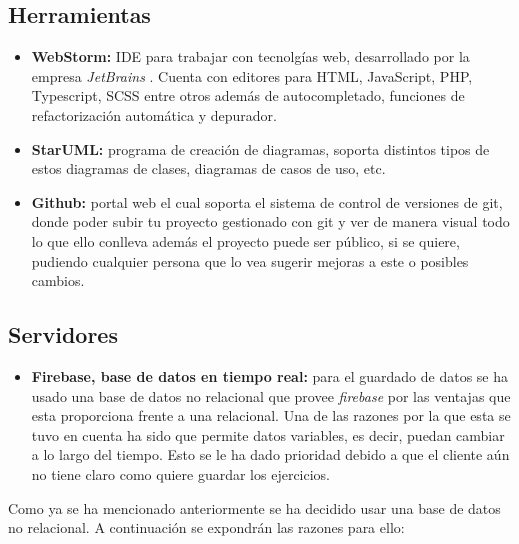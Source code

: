 \subsection{Herramientas}
\begin{itemize}
    \item\textbf{WebStorm:} IDE para trabajar con tecnolgías web, desarrollado por la empresa
    \textit{JetBrains} \cite{jetbrains}. Cuenta con editores para HTML, JavaScript, PHP,
    Typescript, SCSS entre otros además de autocompletado, funciones de refactorización
    automática y depurador.
    \item\textbf{StarUML:} programa de creación de diagramas, soporta distintos tipos de estos
    diagramas de clases, diagramas de casos de uso, etc.
    \item\textbf{Github:} portal web el cual soporta el sistema de control de versiones de git,
    donde poder subir tu proyecto gestionado con git y ver de manera visual todo lo que ello conlleva
    además el proyecto puede ser público, si se quiere, pudiendo cualquier persona que lo vea
    sugerir mejoras a este o posibles cambios.
\end{itemize}

\subsection{Servidores}
\begin{itemize}
    \item\textbf{Firebase, base de datos en tiempo real:} para el guardado de datos se ha usado
    una base de datos no relacional que provee \textit{firebase} por las ventajas que esta proporciona
    frente a una relacional. Una de las razones por la que esta se tuvo en cuenta ha sido que permite
    datos variables, es decir, puedan cambiar a lo largo del tiempo. Esto se le ha dado prioridad
    debido a que el cliente aún no tiene claro como quiere guardar los ejercicios.
\end{itemize}

Como ya se ha mencionado anteriormente se ha decidido usar una base
de datos no relacional. A continuación se expondrán las razones
para ello:

